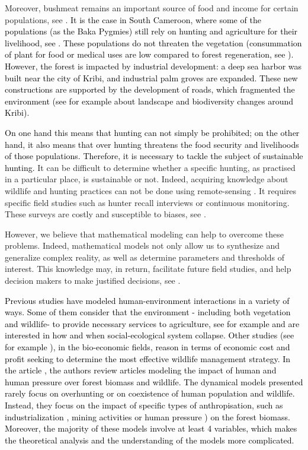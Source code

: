 \documentclass{article}
\newcommand{\vdeux}[1]{\textcolor{black}{#1}}
\newcommand{\vtrois}[1]{\textcolor{black}{#1}}
\theoremstyle{definition}
\theoremstyle{remark}
\begin{document}
Moreover, bushmeat remains an important source of food and income for certain populations, see \cite{jones_incentives_2019}. \vtrois{It is the case in South Cameroon, where some of the populations (as the Baka Pygmies) still rely on hunting and agriculture for their livelihood, see \cite{avila_martin_food_2024}. These populations do not threaten the vegetation (consummation of plant for food or medical uses are low compared to forest regeneration, see \cite{koppert_consommation_1996}). However, the forest is impacted by industrial development: a deep sea harbor was built near the city of Kribi, and industrial palm groves are expanded. These new constructions are supported by the development of roads, which fragmented the environment (see for example \cite{foonde_change_2018, romain_deforestation_2017} about landscape and biodiversity changes around Kribi).
}

\vdeux{
On one hand this means that hunting can not simply be prohibited; on the other hand, it also means that over hunting threatens the food security and livelihoods of those populations. Therefore, it is necessary to tackle the subject of sustainable hunting.
}
It can be difficult to determine whether a specific hunting, as practised in a particular place, is sustainable or not. Indeed, acquiring knowledge about wildlife and hunting practices can not be done using remote-sensing \cite{peres_detecting_2006}. It requires specific field studies such as hunter recall interviews or continuous monitoring. These surveys are costly and susceptible to biases, see \cite{jones_consequences_2020}.

However, we believe that mathematical modeling can help to overcome these problems. Indeed, mathematical models not only allow us to synthesize and generalize complex reality, as well as determine parameters and thresholds of interest. This knowledge may, in return, facilitate future field studies, and help decision makers to make justified decisions, see \cite{deangelis_towards_2021}.

\vdeux{
Previous studies have modeled human-environment interactions in a variety of ways.
Some of them consider that the environment - including both vegetation and wildlife- to provide necessary services to agriculture, see for example \cite{bengochea-paz_agricultural_2020, roman_dynamics_2018} and are interested in how and when social-ecological system collapse. Other studies (see for example \cite{bulte_habitat_2003, nlom_bio-economic_2021}), in the bio-economic fields, reason in terms of economic cost and profit seeking to determine the most effective wildlife management strategy. In the article \cite{fanuel_modelling_2023}, the authors review articles modeling the impact of human and human pressure over forest biomass and wildlife. The dynamical models presented rarely focus on overhunting or on coexistence of human population and wildlife. Instead, they focus on the impact of specific types of anthropisation, such as industrialization \cite{agarwal_depletion_2010}, mining activities or human pressure \cite{dubey_modelling_2009}) on the forest biomass. Moreover, the majority of these models involve at least 4 variables, which makes the theoretical analysis and the understanding of the models more complicated.
}
\end{document}
